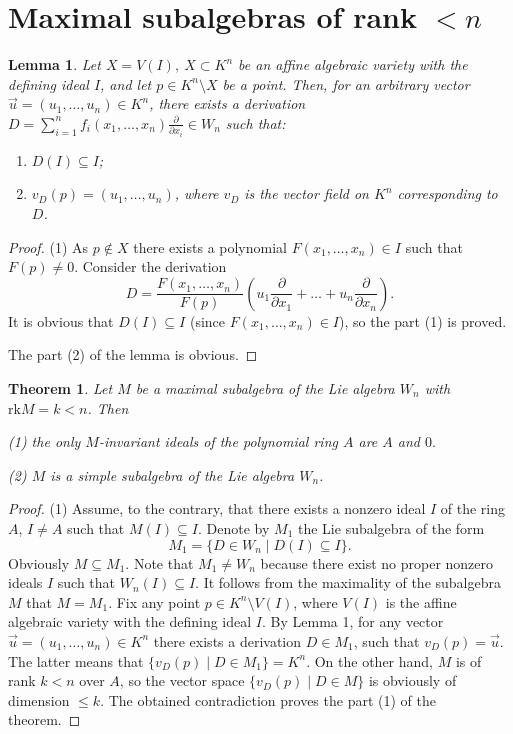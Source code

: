 \documentclass[12pt,a4paper]{amsart}
\theoremstyle{plain}
\newtheorem{theorem}{Theorem}
\newtheorem{lemma}{Lemma}
\theoremstyle{definition}
\begin{document}
{	\section{ Maximal subalgebras of  rank $<n$}
	\begin{lemma}
		Let $X = V(I), \  X \subset K^n$ be an affine algebraic variety with the defining ideal $I$, and let $p\in K^n\setminus X$ be a point. Then, for an arbitrary vector $\vec{u} = (u_1, \dots, u_n) \in K^n$, there exists a derivation $D = \sum_{i=1}^n f_i(x_1, \dots, x_n) \frac{\partial}{\partial x_i}\in W_n$  such that:
		\begin{enumerate}
			\item $D(I) \subseteq I$;
			\item $v_D(p) = (u_1, \dots, u_n)$, where $v_D$ is the vector field on $K^n$ corresponding to $D$.
		\end{enumerate}
	\end{lemma}
	
	\begin{proof}
		(1) As $p \notin X$ there exists a polynomial $F(x_1, \dots, x_n) \in I$ such that $F(p) \neq 0$. Consider the derivation
		\[
		D = \frac{F(x_1, \dots, x_n)}{F(p)} \left( u_1 \frac{\partial}{\partial x_1} + \dots + u_n \frac{\partial}{\partial x_n} \right).
		\]
		It is obvious that $D(I) \subseteq I$ (since $F(x_1, \dots, x_n) \in I$), so the part (1) is proved.
		
		The part (2) of the lemma is obvious.
	\end{proof}	
	\begin{theorem}\label{th1}
		Let $M$ be a maximal subalgebra of the Lie algebra $W_n$ with $\text{rk}M = k < n$. Then
		
		{\rm (1)} the only $M$-invariant ideals of the polynomial ring $A$ are $A$ and $0.$
		
		{\rm (2)} $M$ is a simple subalgebra of the Lie algebra $W_n$.
	\end{theorem}
	
	\begin{proof}
		(1) Assume,  to the contrary, that there exists a nonzero ideal $I$ of the ring $A$, $I \neq A$ such that $M(I) \subseteq I$. Denote by $M_1$ the Lie subalgebra of the form
		\[
		M_1 = \{ D \in W_n \mid D(I) \subseteq I \}.
		\]
		Obviously $M \subseteq M_1$. Note that $M_1 \neq W_n$ because there exist no proper nonzero ideals $I$ such that $W_n(I) \subseteq I$. It follows from the maximality of the subalgebra $M$ that $M = M_1$. Fix any point $p \in K^n \setminus V(I)$, where $V(I)$ is the affine algebraic variety with the defining ideal $I$.
		By Lemma 1, for any vector $\vec{u} = (u_1, \dots, u_n) \in K^n$ there exists a derivation $D \in M_1$, such that $v_D(p)=\vec{u}.  $ The latter means that 
		$\{ v_D(p) \mid D \in M_1 \} = K^n$. On the other hand, $M$ is of rank $k < n$ over $A$, so the vector space $\{ v_D(p) \mid D \in M \}$ is obviously of dimension $\le k$.		
		The obtained contradiction proves the  part (1) of the theorem.
		

\end{proof}}
\end{document}
